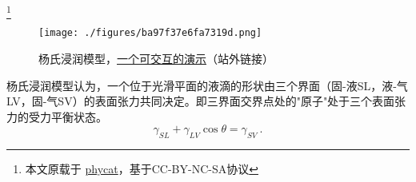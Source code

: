 
\begin{issues}
\issueDraft
\end{issues}

\footnote{本文原载于 \href{https://www.phycat.cn/archives/230/}{phycat}，基于CC-BY-NC-SA协议}

\begin{figure}[ht]
\centering
\texttt{[image: ./figures/ba97f37e6fa7319d.png]}
\caption{杨氏浸润模型，\href{https://www.phycat.cn/archives/230/}{一个可交互的演示}（站外链接）} \label{fig_YNGMDL_1}
\end{figure}
杨氏浸润模型认为，一个位于光滑平面的液滴的形状由三个界面（固-液SL，液-气LV，固-气SV）的表面张力共同决定。即三界面交界点处的"原子"处于三个表面张力的受力平衡状态。
\begin{equation}
\gamma_{SL}+\gamma_{LV}\cos\theta=\gamma_{SV}~.
\end{equation}
